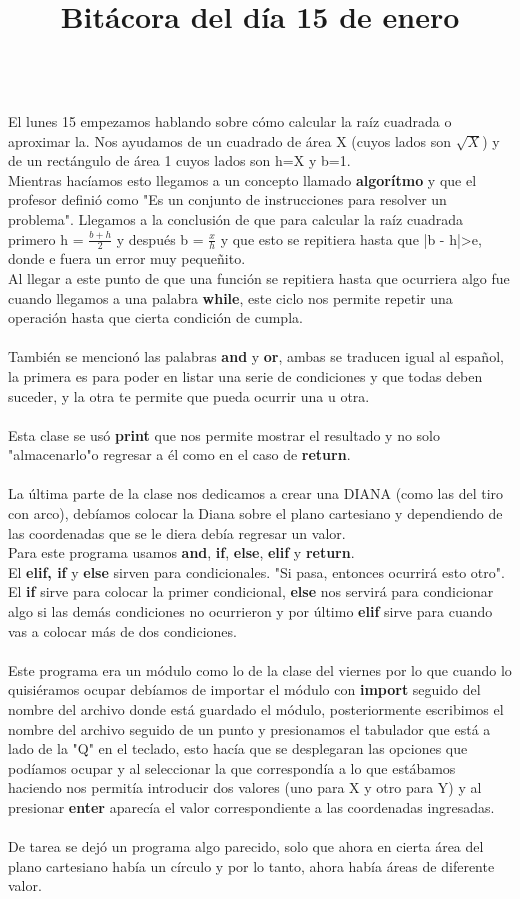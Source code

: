 \documentclass{article}
\begin{document}
	\title{\huge\textbf{Bitácora del día 15 de enero\\}} \\
	El lunes 15 empezamos hablando sobre cómo calcular la raíz cuadrada o aproximar la. Nos ayudamos de un cuadrado de área X (cuyos lados son $\sqrt{X}$) y de un rectángulo de área 1 cuyos lados son h=X y b=1. \\
	Mientras hacíamos esto llegamos a un concepto llamado \textbf{algorítmo} y que el profesor definió como "Es un conjunto de instrucciones para resolver un problema". Llegamos a la conclusión de que para calcular la raíz cuadrada primero h = $\frac{b+h}{2}$ y después b = $\frac{x}{h}$ y que esto se repitiera hasta que |b - h|>e, donde e fuera un error muy pequeñito.\\
	Al llegar a este punto de que una función se repitiera hasta que ocurriera algo fue cuando llegamos a una palabra \textbf{while}, este ciclo nos permite repetir una operación hasta que cierta condición de cumpla.\\ \\
	También se mencionó las palabras \textbf{and} y \textbf{or}, ambas se traducen igual al español, la primera es para poder en listar una serie de condiciones y que todas deben suceder, y la otra te permite que pueda ocurrir una u otra.\\ \\
	Esta clase se usó \textbf{print} que nos permite mostrar el resultado y no solo "almacenarlo"o regresar a él como en el caso de \textbf{return}.\\ \\
	La última parte de la clase nos dedicamos a crear una DIANA (como las del tiro con arco), debíamos colocar la Diana sobre el plano cartesiano y dependiendo de las coordenadas que se le diera debía regresar un valor. \\
	Para este programa usamos \textbf{and}, \textbf{if}, \textbf{else}, \textbf{elif} y \textbf{return}. \\
	El \textbf{elif, if} y \textbf{else} sirven para condicionales. "Si pasa, entonces ocurrirá esto otro". El \textbf{if} sirve para colocar la primer condicional, \textbf{else} nos servirá para condicionar algo si las demás condiciones no ocurrieron y por último \textbf{elif} sirve para cuando vas a colocar más de dos condiciones.\\ \\
	Este programa era un módulo como lo de la clase del viernes por lo que cuando lo quisiéramos ocupar debíamos de importar el módulo con \textbf{import} seguido del nombre del archivo donde está guardado el módulo, posteriormente escribimos el nombre del archivo seguido de un punto y presionamos el tabulador que está a lado de la "Q" en el teclado, esto hacía que se desplegaran las opciones que podíamos ocupar y al seleccionar la que correspondía a lo que estábamos haciendo nos permitía introducir dos valores (uno para X y otro para Y) y al presionar \textbf{enter} aparecía el valor correspondiente a las coordenadas ingresadas. \\ \\
	De tarea se dejó un programa algo parecido, solo que ahora en cierta área del plano cartesiano había un círculo y por lo tanto, ahora había áreas de diferente valor.
	
	
	
	
\end{document}

